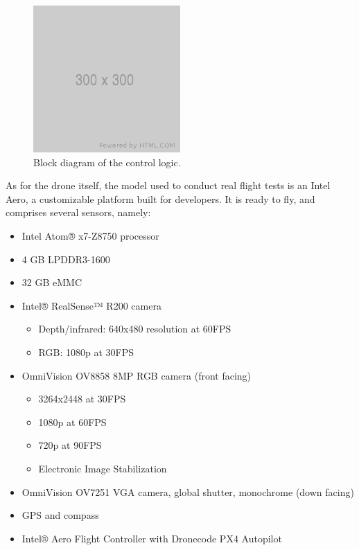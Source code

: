 \begin{figure}[h]
	\centering
	\includegraphics[width=0.5\textwidth]{figure/300x300.png}
	\caption{Block diagram of the control logic.}
	\label{fig:control-block}
\end{figure}


As for the drone itself, the model used to conduct real flight tests is an Intel
Aero, a customizable platform built for developers. It is ready to fly, and
comprises several sensors, namely:

\begin{itemize}
	\item{Intel Atom® x7-Z8750 processor}
	\item{4 GB LPDDR3-1600}
	\item{32 GB eMMC}
	\item{Intel® RealSense™ R200 camera}
		\begin{itemize}
			\item{Depth/infrared: 640x480 resolution at 60FPS}
			\item{RGB: 1080p at 30FPS}
		\end{itemize}
	\item{OmniVision OV8858 8MP RGB camera (front facing)}
		\begin{itemize}
			\item{3264x2448 at 30FPS}
			\item{1080p at 60FPS}
			\item{720p at 90FPS}
			\item{Electronic Image Stabilization}
		\end{itemize}
	\item{OmniVision OV7251 VGA camera, global shutter, monochrome (down facing)}
	\item{GPS and compass}
	\item{Intel® Aero Flight Controller with Dronecode PX4 Autopilot}
\end{itemize}

